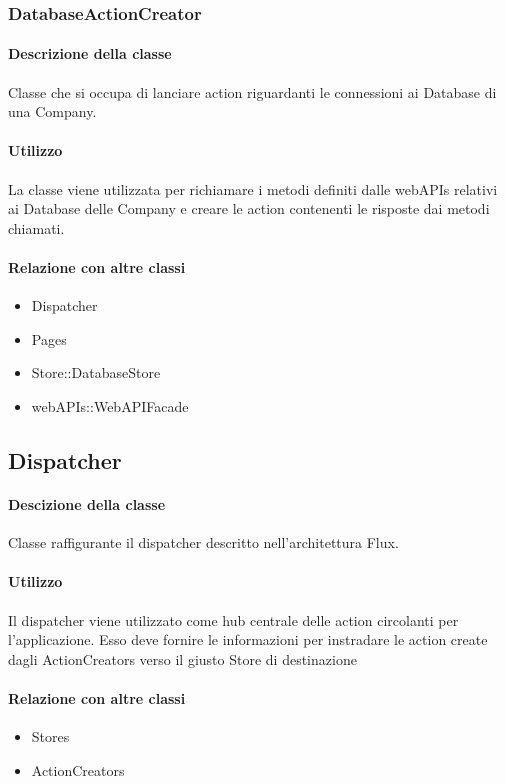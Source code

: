 \subsubsection{DatabaseActionCreator}
\paragraph*{Descrizione della classe}
Classe che si occupa di lanciare action riguardanti le connessioni ai Database di una Company.
\paragraph*{Utilizzo}
La classe viene utilizzata per richiamare i metodi definiti dalle webAPIs relativi ai Database delle Company e creare le action contenenti le risposte dai metodi chiamati.
\paragraph*{Relazione con altre classi}
\begin{itemize}
\item Dispatcher
\item Pages
\item Store::DatabaseStore
\item webAPIs::WebAPIFacade
\end{itemize}

\subsection{Dispatcher}
\paragraph*{Descizione della classe}
Classe raffigurante il dispatcher descritto nell'architettura Flux.
\paragraph*{Utilizzo}
Il dispatcher viene utilizzato come hub centrale delle action circolanti per l'applicazione. Esso deve fornire le informazioni per instradare le action create dagli ActionCreators verso il giusto Store di destinazione
\paragraph*{Relazione con altre classi}
\begin{itemize}
\item Stores
\item ActionCreators
\end{itemize}


